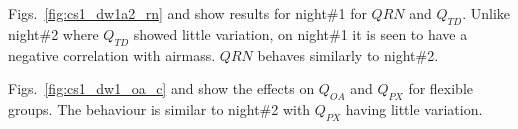 Figs.~\ref{fig:cs1_dw1a2_rn} and  show results for night\#1 for $Q{RN}$ and $Q_{TD}$. Unlike night\#2 where $Q_{TD}$ showed little variation, on night\#1 it is seen to have a negative correlation with airmass. $Q{RN}$ behaves similarly to night\#2. 

Figs.~\ref{fig:cs1_dw1_oa_c} and  show the effects on $Q_{OA}$ and $Q_{PX}$ for flexible groups. The behaviour is similar to night\#2 with $Q_{PX}$ having little variation.


\clearpage
\begin{figure}[h]
 \begin{center}


\end{center}
\end{figure}
